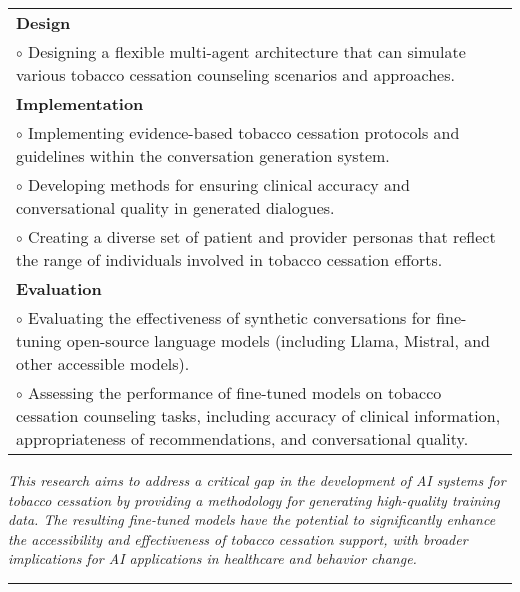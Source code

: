 \begin{center}
\begin{tabular}{|p{}|}
\hline
\cellcolor{gray!15} \textbf{Design} \\
$\circ$ Designing a flexible multi-agent architecture that can simulate various tobacco cessation counseling scenarios and approaches. \\
\hline
\cellcolor{gray!15} \textbf{Implementation} \\
$\circ$ Implementing evidence-based tobacco cessation protocols and guidelines within the conversation generation system. \\
$\circ$ Developing methods for ensuring clinical accuracy and conversational quality in generated dialogues. \\
$\circ$ Creating a diverse set of patient and provider personas that reflect the range of individuals involved in tobacco cessation efforts. \\
\hline
\cellcolor{gray!15} \textbf{Evaluation} \\
$\circ$ Evaluating the effectiveness of synthetic conversations for fine-tuning open-source language models (including Llama, Mistral, and other accessible models). \\
$\circ$ Assessing the performance of fine-tuned models on tobacco cessation counseling tasks, including accuracy of clinical information, appropriateness of recommendations, and conversational quality. \\
\hline
\end{tabular}
\end{center}

\vspace{0.5cm}
\begin{center}
\begin{minipage}{0.9\textwidth}
\begin{center}
\textit{This research aims to address a critical gap in the development of AI systems for tobacco cessation by providing a methodology for generating high-quality training data. The resulting fine-tuned models have the potential to significantly enhance the accessibility and effectiveness of tobacco cessation support, with broader implications for AI applications in healthcare and behavior change.}
\end{center}
\end{minipage}
\end{center}

\begin{center}
\rule{0.7\textwidth}{0.5pt}
\end{center}
